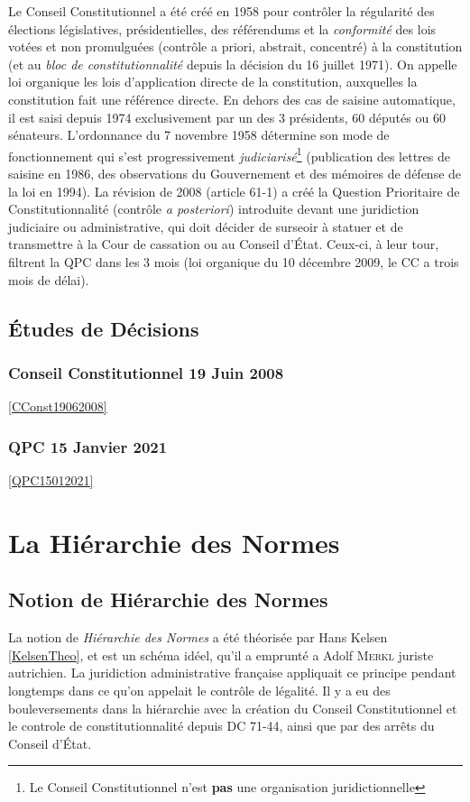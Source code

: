 \documentclass[math]{cours}
\begin{document}
Le Conseil Constitutionnel a été créé en 1958 pour contrôler la régularité des élections législatives, présidentielles, des référendums et la \emph{conformité} des lois votées et non promulguées (contrôle a priori, abstrait, concentré) à la constitution (et au \emph{bloc de constitutionnalité} depuis la décision du 16 juillet 1971).
On appelle loi organique les lois d'application directe de la constitution, auxquelles la constitution fait une référence directe.
En dehors des cas de saisine automatique, il est saisi depuis 1974 exclusivement par un des 3 présidents, 60 députés ou 60 sénateurs.
L'ordonnance du 7 novembre 1958 détermine son mode de fonctionnement qui s'est progressivement \emph{judiciarisé}\footnote{Le Conseil Constitutionnel n'est \textbf{pas} une organisation juridictionnelle} (publication des lettres de saisine en 1986, des observations du Gouvernement et des mémoires de défense de la loi en 1994).
La révision de 2008 (article 61-1) a créé la Question Prioritaire de Constitutionnalité (contrôle \emph{a posteriori}) introduite devant une juridiction judiciaire ou administrative, qui doit décider de surseoir à statuer et de transmettre à la Cour de cassation ou au Conseil d'État.
Ceux-ci, à leur tour, filtrent la QPC dans les 3 mois (loi organique du 10 décembre 2009, le CC a trois mois de délai).

\subsection{Études de Décisions}
\subsubsection{Conseil Constitutionnel 19 Juin 2008}
\ref{CConst19062008}

\subsubsection{QPC 15 Janvier 2021}
\ref{QPC15012021}


\section{La Hiérarchie des Normes}
\subsection{Notion de Hiérarchie des Normes}
La notion de \emph{Hiérarchie des Normes} a été théorisée par Hans Kelsen \ref{KelsenTheo}, et est un schéma idéel, qu'il a emprunté a Adolf \textsc{Merkl} juriste autrichien.
La juridiction administrative française appliquait ce principe pendant longtemps dans ce qu'on appelait le contrôle de légalité.
Il y a eu des bouleversements dans la hiérarchie avec la création du Conseil Constitutionnel et le controle de constitutionnalité depuis DC 71-44, ainsi que par des arrêts du Conseil d'État.
\end{document}
